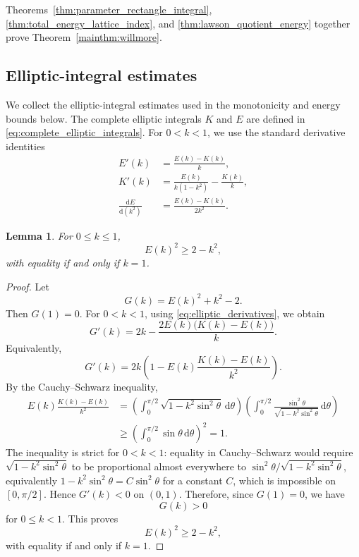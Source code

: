 \documentclass[a4paper,11pt]{amsart}
\numberwithin{equation}{section}
\theoremstyle{plain}
\newtheorem{lem}[thm]{Lemma}
\newcommand{\dif}{\mathrm{d}}
\begin{document}
Theorems~\ref{thm:parameter_rectangle_integral},
\ref{thm:total_energy_lattice_index}, and
\ref{thm:lawson_quotient_energy} together prove
Theorem~\ref{mainthm:willmore}.

\subsection{Elliptic-integral estimates}

We collect the elliptic-integral estimates used in the monotonicity and
energy bounds below. The complete elliptic integrals $K$ and $E$ are defined
in \eqref{eq:complete_elliptic_integrals}. For $0<k<1$,
we use the standard derivative identities
\cite[Eqs.~(19.4.1)--(19.4.2)]{DLMF}
\begin{equation}\label{eq:elliptic_derivatives}
\begin{aligned}
E'(k)
&=\frac{E(k)-K(k)}{k},\\
K'(k)
&=\frac{E(k)}{k(1-k^2)}-\frac{K(k)}{k},\\
\frac{\dif E}{\dif(k^2)}
&=\frac{E(k)-K(k)}{2k^2}.
\end{aligned}
\end{equation}

\begin{lem}\label{lem:E_lower_bound}
For $0\le k\le1$,
\[
    E(k)^2\ge 2-k^2,
\]
with equality if and only if $k=1$.
\end{lem}

\begin{proof}
Let
\[
    G(k)=E(k)^2+k^2-2.
\]
Then $G(1)=0$. For $0<k<1$, using
\eqref{eq:elliptic_derivatives}, we obtain
\[
    G'(k)
    =
    2k-\frac{2E(k)\bigl(K(k)-E(k)\bigr)}{k}.
\]
Equivalently,
\[
    G'(k)
    =
    2k\left(
    1-
    E(k)\frac{K(k)-E(k)}{k^2}
    \right).
\]
By the Cauchy--Schwarz inequality,
\[
\begin{aligned}
E(k)\frac{K(k)-E(k)}{k^2}
&=
\left(\int_0^{\pi/2}\sqrt{1-k^2\sin^2\theta}\,\dif\theta\right)
\left(\int_0^{\pi/2}
\frac{\sin^2\theta}{\sqrt{1-k^2\sin^2\theta}}\,\dif\theta\right)\\
&\ge
\left(\int_0^{\pi/2}\sin\theta\,\dif\theta\right)^2
=
1.
\end{aligned}
\]
The inequality is strict for $0<k<1$: equality in
Cauchy--Schwarz would require
$\sqrt{1-k^2\sin^2\theta}$ to be proportional almost everywhere to
$\sin^2\theta/\sqrt{1-k^2\sin^2\theta}$, equivalently
$1-k^2\sin^2\theta=C\sin^2\theta$ for a constant $C$, which is impossible
on $[0,\pi/2]$. Hence $G'(k)<0$ on $(0,1)$.
Therefore, since $G(1)=0$, we have
\[
    G(k)>0
\]
for $0\le k<1$. This proves
\[
    E(k)^2\ge 2-k^2,
\]
with equality if and only if $k=1$.
\end{proof}
\end{document}
